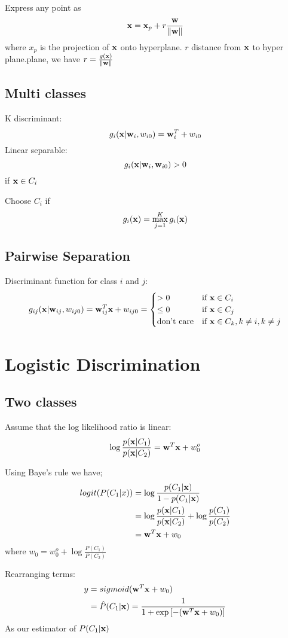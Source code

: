     Express any point as 
    \[\mathbf{x} = \mathbf{x}_p  + r\frac{\mathbf{w}}{\|\mathbf{w}\|}\]
    where $x_p$ is the  projection of $\mathbf{x}$ onto hyperplane. $r$ distance
    from $\mathbf{x}$ to hyper plane.plane, we have $r=\frac{g(\mathbf{x})}{\|\mathbf{w}\|}$
\subsection{Multi classes} 
K discriminant:
\[g_i(\mathbf{x} |\mathbf{w}_i, w_{i0}) = \mathbf{w}_i^T + w_{i0}\]
Linear separable: \[g_i(\mathbf{x}|\mathbf{w}_i, \mathbf{w}_{i0}) > 0\] if $\mathbf{x} \in
        C_i$
        
        Choose $C_i$ if \[g_i(\mathbf{x}) = \max_{j=1}^K g_i(\mathbf{x})\]

\subsection{Pairwise Separation} 
    Discriminant function for class $i$ and $j$:
        \[
            g_{ij} (\mathbf{x}|\mathbf{w}_{ij}, w_{ij0}) = \mathbf{w}_{ij}^T\mathbf{x} + w_{ij0} =
            \begin{cases}
                > 0 & \mbox{if } \mathbf{x} \in C_i\\
                \leq 0 & \mbox{if } \mathbf{x} \in C_j\\
                \mbox{don't care} & \mbox{if } \mathbf{x} \in C_k, k\neq i, k\neq j
            \end{cases} \]
\section{Logistic Discrimination}
\subsection{Two classes}
     Assume that the log likelihood ratio is linear:
        \[\log\frac{p(\mathbf{x}|C_1)}{p(\mathbf{x}|C_2)} = \mathbf{w}^T\mathbf{x} + w_0^o \]

    Using Baye's rule we have;
        \begin{align*}
            logit(P(C_1|x)) & = \log\frac{p(C_1|\mathbf{x})}{1 - p(C_1|\mathbf{x})} \\
            & = \log\frac{p(\mathbf{x}|C_1)}{p(\mathbf{x}|C_2)} + \log\frac{p(C_1)}{p(C_2)} \\
            & = \mathbf{w}^T\mathbf{x} + w_0
        \end{align*}
        where $w_0 = w_0^o + \log\frac{P(C_1)}{P(C_2)}$

       Rearranging terms: 
        \begin{align*} y  & = sigmoid(\mathbf{w}^T\mathbf{x} + w_0) \\
            & =  \hat{P}(C_1|\mathbf{x}) = \frac{1}{1 + \exp\left[-(\mathbf{w}^T\mathbf{x} + w_0 )\right]}
        \end{align*}
        As our estimator of $P(C_1|\mathbf{x})$

